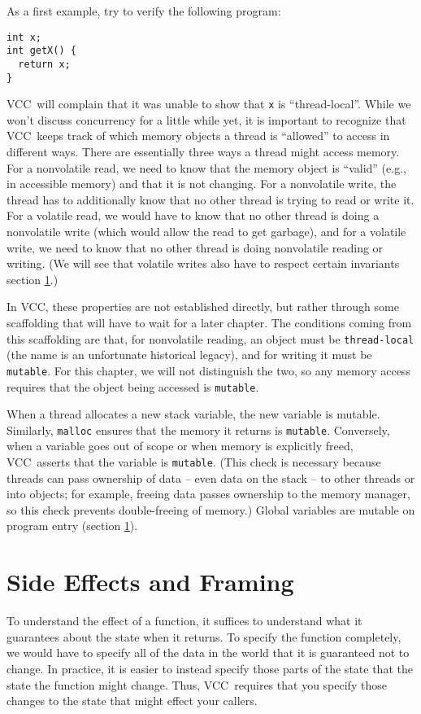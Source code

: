 \documentclass{report}
\newcommand{\Q}[1]{\lstinline~#1~}
\newcommand{\VCC}{VCC}
\newcommand{\Ref}[1]{section \ref{#1}}
\begin{document}
As a first example, try to verify the following program:
\begin{lstlisting}
int x;
int getX() {
  return x;
}
\end{lstlisting}
\VCC\ will complain that it was unable to show that \Q{x} is
``thread-local''. While we won't discuss concurrency for a little
while yet, it is important to recognize that \VCC\ keeps track of
which memory objects a thread is ``allowed'' to access in different
ways. There are essentially three ways a thread might access
memory. For a nonvolatile read, we need to know that the memory object
is ``valid'' (e.g., in accessible memory) and that it is not
changing. For a nonvolatile write, the thread has to additionally know
that no other thread is trying to read or write it. For a volatile
read, we would have to know that no other thread is doing a
nonvolatile write (which would allow the read to get garbage), and for
a volatile write, we need to know that no other thread is doing
nonvolatile reading or writing. (We will see that volatile writes also
have to respect certain invariants \Ref{}.)

In \VCC, these properties are not established directly, but rather
through some scaffolding that will have to wait for a later
chapter. The conditions coming from this scaffolding are that, for
nonvolatile reading, an object must be \Q{thread-local} (the name is
an unfortunate historical legacy), and for writing it must be \Q{mutable}.
For this chapter, we will not distinguish the two, so any memory
access requires that the object being accessed is \Q{mutable}.

When a thread allocates a new stack variable, the new variable is
mutable. Similarly, \Q{malloc} ensures that the memory it returns is
\Q{mutable}. Conversely, when a variable goes out of scope or when
memory is explicitly freed, \VCC\ asserts that the variable is
\Q{mutable}. (This check is necessary because threads can pass ownership of
data -- even data on the stack -- to other threads or into objects;
for example, freeing data passes ownership to the memory manager, so
this check prevents double-freeing of memory.) Global variables are
mutable on program entry (\Ref{}).


\section{Side Effects and Framing}

To understand the effect of a function, it suffices to understand what
it guarantees about the state when it returns. To specify the function
completely, we would have to specify all of the data in the world that
it is guaranteed not to change. In practice, it is easier to instead specify
those parts of the state that the state the function might change. 
Thus, \VCC\ requires that you specify those changes to the state that
might effect your callers.
\end{document}

